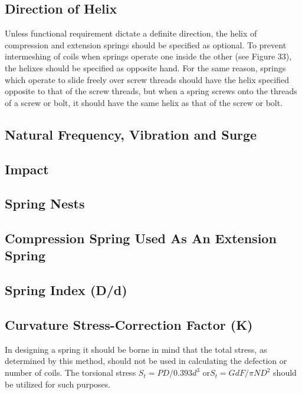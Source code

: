 \documentclass[10pt]{article}
\begin{document}
\subsection{Direction of Helix} %
Unless functional requirement dictate a definite direction, the helix of compression and extension springs should be specified as optional. 
To prevent intermeshing of coils when springs operate one inside the other (see Figure 33), the helixes should be specified as opposite hand. 
For the same reason, springs which operate to slide freely over screw threads should have the helix specified opposite to that of the screw threads, but when a spring screws onto the threads of a screw or bolt, it should have the same helix as that of the screw or bolt.

\subsection{Natural Frequency, Vibration and Surge} %

\subsection{Impact} %

\subsection{Spring Nests} %

\subsection{Compression Spring Used As An Extension Spring} %

\subsection{Spring Index (D/d)} %

\subsection{Curvature Stress-Correction Factor (K)} %

In designing a spring it should be borne in mind that the total stress, as determined by this method, should not be used in calculating the defection or number of coils. 
The torsional stress $S_t = PD/0.393 d^3$ or$ S_t = G d F/ \pi N D^2$ should be utilized for such purposes.
\end{document}
